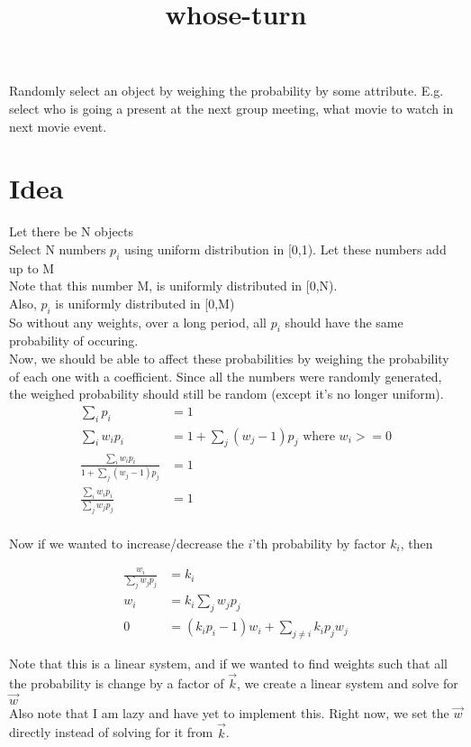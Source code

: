 \documentclass[letterpaper]{article}
\title{whose-turn}
\author{}
\begin{document}
\maketitle
Randomly select an object by weighing the probability by some attribute. 
E.g. select who is going a present at the next group meeting, what movie to watch in next movie event.

\section{Idea}
Let there be N objects\\
Select N numbers {$p_i$} using uniform distribution in [0,1). Let these numbers add up to M\\
Note that this number M, is uniformly distributed in [0,N).\\
Also, $p_i$ is uniformly distributed in [0,M)\\
So without any weights, over a long period, all $p_i$ should have the same probability of occuring.\\
Now, we should be able to affect these probabilities by weighing the probability of each one with a coefficient. Since all the numbers were randomly generated, the weighed probability should still be random (except it's no longer uniform).\\

\begin{equation}
\begin{split}
\sum_i p_i &= 1\\
\sum_i w_i p_i &= 1+\sum_j(w_j-1)p_j \mbox{ where $w_i>=0$}\\
\frac{\sum_i w_i p_i}{1+\sum_j(w_j-1)p_j} &= 1\\
\frac{\sum_i w_i p_i}{\sum_j w_j p_j} &= 1\\
\end{split}
\end{equation}

Now if we wanted to increase/decrease the $i$'th probability by factor $k_i$, then 

\begin{equation}
\begin{split}
\frac{w_i}{\sum_j w_j p_j} &= k_i\\
w_i &= k_i \sum_j w_j p_j\\
0 &= (k_i p_i-1)w_i + \sum_{j\neq i}  k_i p_j w_j
\end{split}
\end{equation}

Note that this is a linear system, and if we wanted to find weights such that all the probability is change by a factor of $\vec{k}$, we create a linear system and solve for $\vec{w}$\\
Also note that I am lazy and have yet to implement this. Right now, we set the $\vec{w}$ directly instead of solving for it from $\vec{k}$.\\
\end{document}
